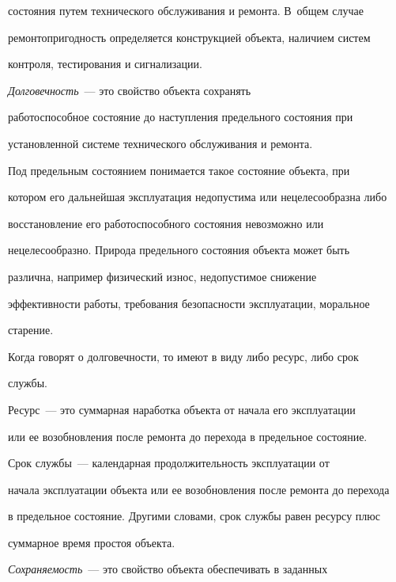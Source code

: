 состояния путем технического обслуживания и ремонта. В~общем случае 


ремонтопригодность определяется конструкцией объекта, наличием систем 


контроля, тестирования и сигнализации. 


     


     \textit{Долговечность}~--- это свойство объекта сохранять 


работоспособное состояние до наступления предельного состояния при 


установленной системе технического обслуживания и ремонта. 


     


     Под предельным состоянием понимается такое состояние объекта, при 


котором его дальнейшая эксплуатация недопустима или нецелесообразна либо 


восстановление его работоспособного состояния невозможно или 


нецелесообразно. Природа предельного состояния объекта может быть 


различна, например физический износ, недопустимое снижение 


эффективности работы, требования безопасности эксплуатации, моральное 


старение. 


     


     Когда говорят о долговечности, то имеют в виду либо ресурс, либо срок 


службы. 


          Ресурс~--- это суммарная наработка объекта от начала его эксплуатации 


или ее возобновления после ремонта до перехода в предельное состояние.


     


     Срок службы~--- календарная продолжительность эксплуатации от 


начала эксплуатации объекта или ее возобновления после ремонта до перехода 


в предельное состояние. Другими словами, срок службы равен ресурсу плюс 


суммарное время простоя объекта.


     


     \textit{Сохраняемость}~--- это свойство объекта обеспечивать в заданных 


